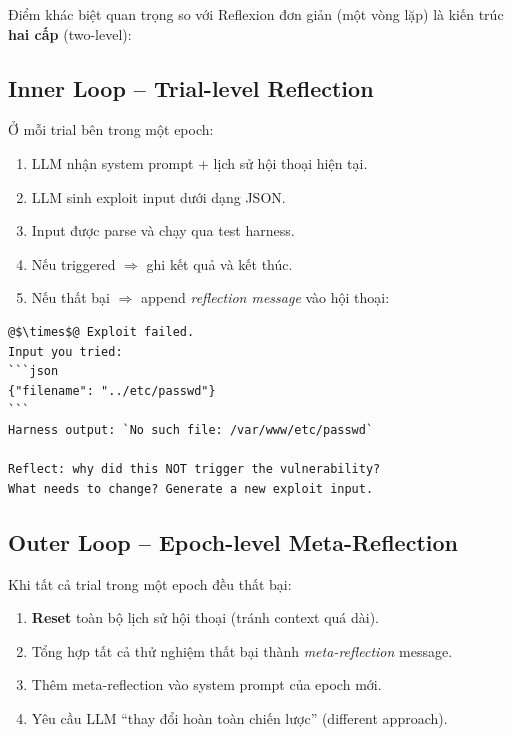 \documentclass{nt521report}
\begin{document}
Điểm khác biệt quan trọng so với Reflexion đơn giản (một vòng lặp) là kiến trúc \textbf{hai cấp} (two-level):

\subsection{Inner Loop -- Trial-level Reflection}

Ở mỗi trial bên trong một epoch:
\begin{enumerate}
  \item LLM nhận system prompt + lịch sử hội thoại hiện tại.
  \item LLM sinh exploit input dưới dạng JSON.
  \item Input được parse và chạy qua test harness.
  \item Nếu triggered $\Rightarrow$ ghi kết quả và kết thúc.
  \item Nếu thất bại $\Rightarrow$ append \textit{reflection message} vào hội thoại:
\end{enumerate}

\begin{lstlisting}[caption={Mẫu reflection message gửi cho LLM sau mỗi lần thất bại}]
@$\times$@ Exploit failed.
Input you tried:
```json
{"filename": "../etc/passwd"}
```
Harness output: `No such file: /var/www/etc/passwd`

Reflect: why did this NOT trigger the vulnerability?
What needs to change? Generate a new exploit input.
\end{lstlisting}

\subsection{Outer Loop -- Epoch-level Meta-Reflection}

Khi tất cả trial trong một epoch đều thất bại:
\begin{enumerate}
  \item \textbf{Reset} toàn bộ lịch sử hội thoại (tránh context quá dài).
  \item Tổng hợp tất cả thử nghiệm thất bại thành \textit{meta-reflection} message.
  \item Thêm meta-reflection vào system prompt của epoch mới.
  \item Yêu cầu LLM ``thay đổi hoàn toàn chiến lược'' (different approach).
\end{enumerate}
\end{document}
